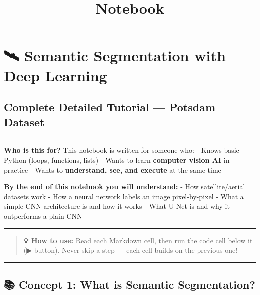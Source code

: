 \documentclass[11pt]{article}
\title{Notebook}
\begin{document}
    
    \maketitle
    
    

    
    \section{🛰️ Semantic Segmentation with Deep
Learning}\label{semantic-segmentation-with-deep-learning}

\subsection{Complete Detailed Tutorial --- Potsdam
Dataset}\label{complete-detailed-tutorial-potsdam-dataset}

\begin{center}\rule{0.5\linewidth}{0.5pt}\end{center}

\textbf{Who is this for?} This notebook is written for someone who: -
Knows basic Python (loops, functions, lists) - Wants to learn
\textbf{computer vision AI} in practice - Wants to \textbf{understand,
see, and execute} at the same time

\textbf{By the end of this notebook you will understand:} - How
satellite/aerial datasets work - How a neural network labels an image
pixel-by-pixel - What a simple CNN architecture is and how it works -
What U-Net is and why it outperforms a plain CNN

\begin{center}\rule{0.5\linewidth}{0.5pt}\end{center}

\begin{quote}
\textbf{💡 How to use:} Read each Markdown cell, then run the code cell
below it (▶ button). Never skip a step --- each cell builds on the
previous one!
\end{quote}

    \begin{center}\rule{0.5\linewidth}{0.5pt}\end{center}

\subsection{📚 Concept 1: What is Semantic
Segmentation?}\label{concept-1-what-is-semantic-segmentation}
\end{document}
